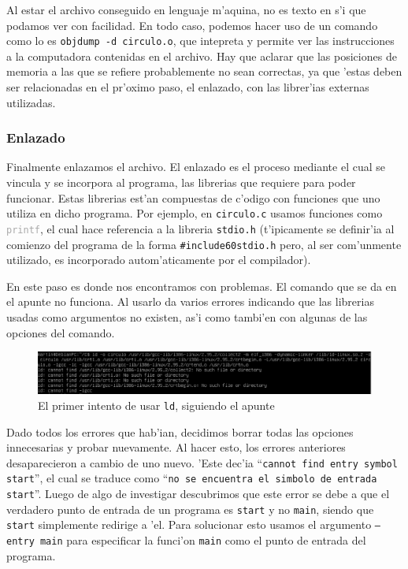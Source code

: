 \documentclass[11pt]{article}
\begin{document}
		Al estar el archivo conseguido en lenguaje m'aquina, no es texto en s'i que podamos ver con facilidad. En todo caso, podemos hacer uso de un comando como lo es \texttt{objdump -d circulo.o}, que intepreta y permite ver las instrucciones a la computadora contenidas en el archivo. Hay que aclarar que las posiciones de memoria a las que se refiere probablemente no sean correctas, ya que 'estas deben ser relacionadas en el pr'oximo paso, el enlazado, con las librer'ias externas utilizadas.
		
	\subsubsection{Enlazado}
		Finalmente enlazamos el archivo. El enlazado es el proceso mediante el cual se vincula y se incorpora al programa, las librerias que requiere para poder funcionar. Estas librerias est'an compuestas de c'odigo con funciones que uno utiliza en dicho programa. Por ejemplo, en \texttt{circulo.c} usamos funciones como \texttt{\textcolor{darkgray}{printf}}, el cual hace referencia a la libreria \texttt{stdio.h} (t'ipicamente se definir'ia al comienzo del programa de la forma \texttt{\textcolor{fuchsia-vim}{\#include}\textcolor{orange-desert-vim}{\char60stdio.h}} pero, al ser com'unmente utilizado, es incorporado autom'aticamente por el compilador).
		
		En este paso es donde nos encontramos con problemas. El comando que se da en el apunte no funciona. Al usarlo da varios errores indicando que las librerias usadas como argumentos no existen, as'i como tambi'en con algunas de las opciones del comando.
	
		\begin{figure}[H]
			\centering
			\includegraphics[width=.9\linewidth]{Images/Seccion 1/S1 parte cinco}
			\caption{El primer intento de usar \texttt{ld}, siguiendo el apunte}
			\label{fig:first-ld-attempt}
		\end{figure}
		
		Dado todos los errores que hab'ian, decidimos borrar todas las opciones innecesarias y probar nuevamente. Al hacer esto, los errores anteriores desaparecieron a cambio de uno nuevo. 'Este dec'ia ``\texttt{cannot find entry symbol \textunderscore\/start}'', el cual se traduce como ``\texttt{no se encuentra el simbolo de entrada \textunderscore\/start}''. Luego de algo de investigar descubrimos que este error se debe a que el verdadero punto de entrada\footnotemark\/ de un programa es \texttt{\textunderscore\/start} y no \texttt{main}, siendo que \texttt{\textunderscore\/start} simplemente redirige a 'el. Para solucionar esto usamos el argumento \texttt{--entry main} para especificar la funci'on \texttt{main} como el punto de entrada del programa.
		
\end{document}
